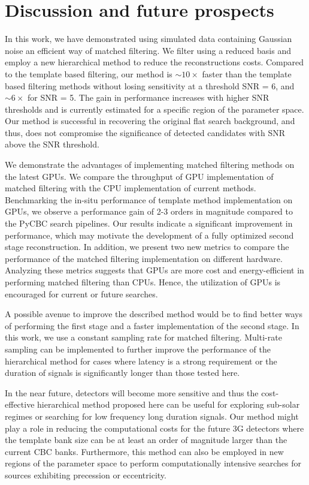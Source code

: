 \section{Discussion and future prospects}\label{Discussion_and_future_prospects}

In this work, we have demonstrated using simulated data containing Gaussian noise an efficient way of matched filtering. We filter using a reduced basis and employ a new hierarchical method to reduce the reconstructions costs. Compared to the template based filtering, our method is $\sim 10\times$ faster than the template based filtering methods without losing sensitivity at a threshold SNR = 6, and $\sim 6 \times$ for SNR = 5. The gain in performance increases with higher SNR thresholds and is currently estimated for a specific region of the parameter space. Our method is successful in recovering the original flat search background, and thus, does not compromise the significance of detected candidates with SNR above the SNR threshold.

We demonstrate the advantages of implementing matched filtering methods on the latest GPUs. We compare the throughput of GPU implementation of matched filtering with the CPU implementation of current methods. Benchmarking the in-situ performance of template method implementation on GPUs, we observe a performance gain of 2-3 orders in magnitude compared to the PyCBC search pipelines. Our results indicate a significant improvement in performance, which may motivate the development of a fully optimized second stage reconstruction.  In addition, we present two new metrics to compare the performance of the matched filtering implementation on different hardware. Analyzing these metrics suggests that GPUs are more cost and energy-efficient in performing matched filtering than CPUs. Hence, the utilization of GPUs is encouraged for current or future searches.

A possible avenue to improve the described method would be to find better ways of performing the first stage and a faster implementation of the second stage. In this work, we use a constant sampling rate for matched filtering. Multi-rate sampling can be implemented to further improve the performance of the hierarchical method for cases where latency is a strong requirement or the duration of signals is significantly longer than those tested here. 

In the near future, detectors will become more sensitive and thus the cost-effective hierarchical method proposed here can be useful for exploring sub-solar regimes or searching for low frequency long duration signals. Our method might play a role in reducing the computational costs for the future 3G detectors where the template bank size can be at least an order of magnitude larger \cite{ianharry_precession, ET-templates} than the current CBC banks. Furthermore, this method can also be employed in new regions of the parameter space to perform computationally intensive searches for sources exhibiting precession or eccentricity.


